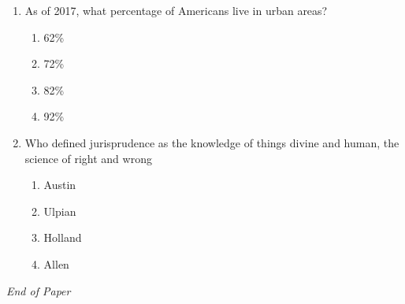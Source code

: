 \documentclass[12pt]{article}
\begin{document}
\begin{enumerate}[label=\arabic*.]
\begin{enumerate}[label=(\alph*)]
    \item are particularly in touch with social reality
    \item have experienced acute onset of significant symptoms
\end{enumerate}
\item As of 2017, what percentage of Americans live in urban areas?
\begin{enumerate}[label=(\alph*)]
    \item 62\%
    \item 72\%
    \item 82\%
    \item 92\%
\end{enumerate}
\item Who defined jurisprudence as the knowledge of things divine and human, the science of right and wrong
\begin{enumerate}[label=(\alph*)]
    \item Austin
    \item Ulpian
    \item Holland
    \item Allen
\end{enumerate}
\end{enumerate}

\vfill
\noindent\textit{End of Paper}
\end{document}
